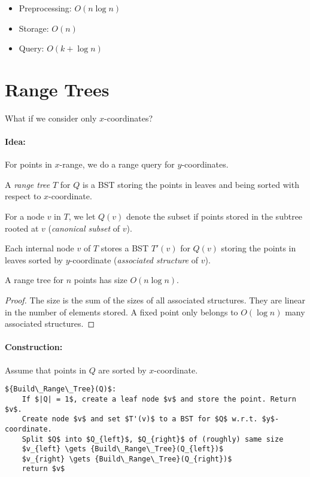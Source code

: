 \begin{itemize}
	\item {Preprocessing:} $O(n \log n)$
	\item {Storage: } $O(n)$
	\item {Query:} $O(k + \log n)$
\end{itemize}

\section{Range Trees}

What if we consider only $x$-coordinates?

\paragraph{Idea:} For points in $x$-range, we do a range query for $y$-coordinates.

\begin{mydefinition}
A \emph{range tree} $T$ for $Q$ is a BST storing the points in leaves and being sorted with respect to $x$-coordinate.
	
	For a node $v$ in $T$, we let $Q(v)$ denote the subset if points stored in the subtree rooted at $v$ (\emph{canonical subset} of $v$).
	
	Each internal node $v$ of $T$ stores a BST $T'(v)$ for $Q(v)$ storing the points in leaves sorted by $y$-coordinate (\emph{associated structure} of $v$).	
\end{mydefinition}

\begin{mylemma}
A range tree for $n$ points has size $O(n \log n)$.	
\end{mylemma}
\begin{proof}
	The size is the sum of the sizes of all associated structures. They are linear in the number of elements stored. A fixed point only belongs to $O(\log n)$ many associated structures.
\end{proof}

\paragraph{Construction:} Assume that points in $Q$ are sorted by $x$-coordinate.

\begin{lstlisting}[mathescape]
${Build\_Range\_Tree}(Q)$:
	If $|Q| = 1$, create a leaf node $v$ and store the point. Return $v$.
	Create node $v$ and set $T'(v)$ to a BST for $Q$ w.r.t. $y$-coordinate.
	Split $Q$ into $Q_{left}$, $Q_{right}$ of (roughly) same size
	$v_{left} \gets {Build\_Range\_Tree}(Q_{left})$ 
	$v_{right} \gets {Build\_Range\_Tree}(Q_{right})$
	return $v$	
\end{lstlisting}

